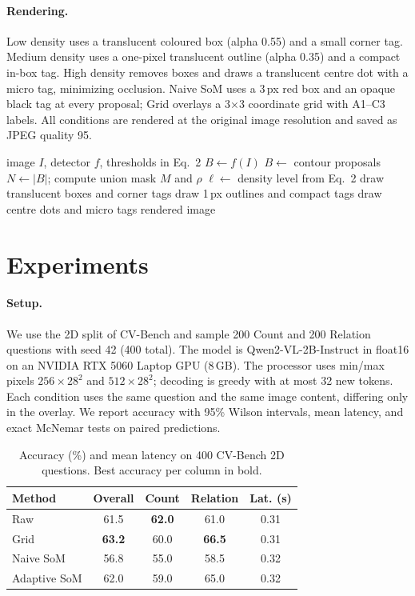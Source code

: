 \documentclass[10pt,twocolumn]{article}
\newcommand{\best}[1]{\textbf{#1}}
\begin{document}
\paragraph{Rendering.}
Low density uses a translucent coloured box (alpha 0.55) and a small corner tag. Medium density uses a one-pixel translucent outline (alpha 0.35) and a compact in-box tag. High density removes boxes and draws a translucent centre dot with a micro tag, minimizing occlusion. Naive SoM uses a 3\,px red box and an opaque black tag at every proposal; Grid overlays a 3$\times$3 coordinate grid with A1--C3 labels. All conditions are rendered at the original image resolution and saved as JPEG quality 95.

\begin{algorithm}[t]
\caption{Density-aware visual prompting}
\label{alg:avp}
\begin{algorithmic}[1]
\Require image $I$, detector $f$, thresholds in Eq.~2
\State $B \gets f(I)$ 
    \State $B\gets$ contour proposals
\EndIf
\State $N\gets|B|$; compute union mask $M$ and $\rho$
\State $\ell\gets$ density level from Eq.~2
    \State draw translucent boxes and corner tags
    \State draw 1\,px outlines and compact tags
\Else
    \State draw centre dots and micro tags
\EndIf
\State \Return rendered image
\end{algorithmic}
\end{algorithm}

\section{Experiments}
\label{sec:exp}
\paragraph{Setup.}
We use the 2D split of CV-Bench and sample 200 Count and 200 Relation questions with seed 42 (400 total). The model is Qwen2-VL-2B-Instruct in float16 on an NVIDIA RTX 5060 Laptop GPU (8\,GB). The processor uses min/max pixels $256\times28^2$ and $512\times28^2$; decoding is greedy with at most 32 new tokens. Each condition uses the same question and the same image content, differing only in the overlay. We report accuracy with 95\% Wilson intervals, mean latency, and exact McNemar tests on paired predictions.

\begin{table}[t]
\centering
\small
\setlength{\tabcolsep}{3.2pt}
\begin{tabular}{lcccc}
\toprule
Method & Overall & Count & Relation & Lat. (s) \\
\midrule
Raw & 61.5 & \best{62.0} & 61.0 & 0.31 \\
Grid & \best{63.2} & 60.0 & \best{66.5} & 0.31 \\
Naive SoM & 56.8 & 55.0 & 58.5 & 0.32 \\
Adaptive SoM & 62.0 & 59.0 & 65.0 & 0.32 \\
\bottomrule
\end{tabular}
\caption{Accuracy (\%) and mean latency on 400 CV-Bench 2D questions. Best accuracy per column in bold.}
\label{tab:main}
\end{table}
\end{document}
